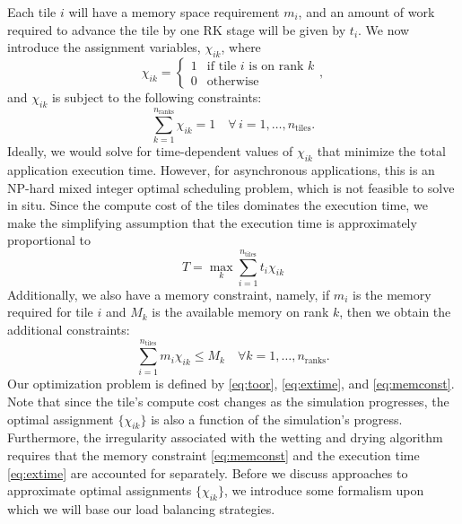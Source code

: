 Each tile $i$ will have a memory space requirement $m_i$, and an amount of work required to advance the tile by one RK stage will be given by $t_i$. We now introduce the assignment variables, $\chi_{ik}$, where
\begin{displaymath}
\chi_{ik} = \begin{cases}
1 & \text{if tile $i$ is on rank $k$}\\
0 & \text{otherwise}
\end{cases},
\end{displaymath}
and $\chi_{ik}$ is subject to the following constraints:
\begin{equation}
\sum_{k=1}^{n_{\text{ranks}}} \chi_{ik} =1 \quad \forall\, i=1,\ldots,n_{\text{tiles}}.
\label{eq:toor}
\end{equation}
Ideally, we would solve for time-dependent values of $\chi_{ik}$ that minimize the total application execution time. However, for asynchronous applications, this is an NP-hard mixed integer optimal scheduling problem, which is not feasible to solve in situ. Since the compute cost of the tiles dominates the execution time, we make the simplifying assumption that the execution time is approximately proportional to 
\begin{equation}
T = \max_k \sum_{i=1}^{n_{\text{tiles}}} t_i \chi_{ik}
\label{eq:extime}
\end{equation}
Additionally, we also have a memory constraint, namely, if $m_i$ is the memory required for tile $i$ and $M_k$ is the available memory on rank $k$, then we obtain the additional constraints:
\begin{equation}
\sum_{i=1}^{n_{\text{tiles}}} m_i \chi_{ik} \le M_k \quad \forall k=1,\ldots,n_{\text{ranks}}.
\label{eq:memconst}
\end{equation}
Our optimization problem is defined by \eqref{eq:toor}, \eqref{eq:extime}, and \eqref{eq:memconst}. Note that since the tile's compute cost changes as the simulation progresses, the optimal assignment $\{\chi_{ik}\}$ is also a function of the simulation's progress.  Furthermore, the irregularity associated with the wetting and drying algorithm requires that the memory constraint \eqref{eq:memconst} and the execution time \eqref{eq:extime} are accounted for separately.
Before we discuss approaches to approximate optimal assignments $\{\chi_{ik}\}$, we introduce some formalism upon which we will base our load balancing strategies.

